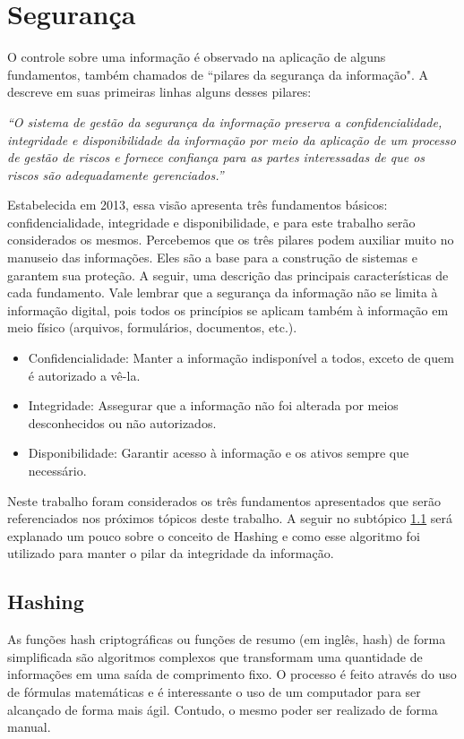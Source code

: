 \documentclass[12pt, a4paper]{report}
\begin{document}
\section{ Segurança}
\label{sec:seguranca}

O controle sobre uma informação é observado na aplicação de alguns fundamentos, também chamados de “pilares da segurança da informação". A \cite{iso27001} descreve em suas primeiras linhas alguns desses pilares:

\textit{“O sistema de gestão da segurança da informação preserva a confidencialidade, integridade e disponibilidade da informação por meio da aplicação de um processo de gestão de riscos e fornece confiança para as partes interessadas de que os riscos são adequadamente gerenciados.”}

Estabelecida em 2013, essa visão apresenta três fundamentos básicos: confidencialidade, integridade e disponibilidade, e para este trabalho serão considerados os mesmos. Percebemos que os três pilares podem auxiliar muito no manuseio das informações. Eles são a base para a construção de sistemas e garantem sua proteção. A seguir, uma descrição das principais características de cada fundamento. Vale lembrar que a segurança da informação não se limita à informação digital, pois todos os princípios se aplicam também à informação em meio físico (arquivos, formulários, documentos, etc.).
\begin{itemize}
\item Confidencialidade: Manter a informação indisponível a todos, exceto de quem é autorizado a vê-la.
\item Integridade: Assegurar que a informação não foi alterada por meios desconhecidos ou não autorizados.
\item Disponibilidade: Garantir acesso à informação e os ativos sempre que necessário.
\end{itemize}

Neste trabalho foram considerados os três fundamentos apresentados que serão referenciados nos próximos tópicos deste trabalho. A seguir no subtópico \ref{subsec:hash} será explanado um pouco sobre o conceito de Hashing e como esse algoritmo foi utilizado para manter o pilar da integridade da informação.

\subsection{Hashing}
\label{subsec:hash}
As funções hash criptográficas ou funções de resumo (em inglês, hash) de forma simplificada são algoritmos complexos que transformam uma quantidade de informações em uma saída de comprimento fixo. O processo é feito através do uso de fórmulas matemáticas e é interessante o uso de um computador para ser alcançado de forma mais ágil. Contudo, o mesmo poder ser realizado de forma manual.
\end{document}
